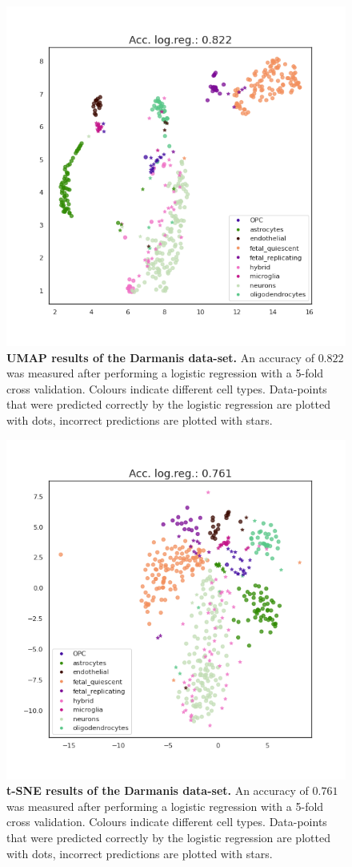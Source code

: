 \begin{figure}
    \centering
    \includegraphics[width=.6\linewidth]{figs/darmanis_UMAP_logres.png}
    \caption[UMAP results of the Darmanis data-set.]{\small \textbf{UMAP results of the Darmanis data-set.} \small An accuracy of $0.822$ was measured after performing a logistic regression with a 5-fold cross validation. Colours indicate different cell types. Data-points that were predicted correctly by the logistic regression are plotted with dots, incorrect predictions are plotted with stars.}
    \label{fig:darmanis_umap}
\end{figure}

\begin{figure}
    \centering
    \includegraphics[width=.6\linewidth]{figs/darmanis_tsne_logres.png}
    \caption[t-SNE results of the Darmanis data-set.]{\small \textbf{t-SNE results of the Darmanis data-set.} \small An accuracy of $0.761$ was measured after performing a logistic regression with a 5-fold cross validation. Colours indicate different cell types. Data-points that were predicted correctly by the logistic regression are plotted with dots, incorrect predictions are plotted with stars.}
    \label{fig:darmanis_tsne}
\end{figure}



